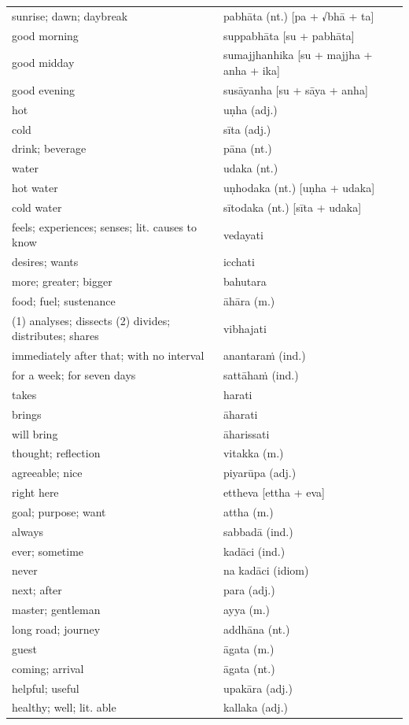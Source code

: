 \documentclass[11pt,oneside]{memoir}
\begin{document}
\begin{center}
\begin{tabular}{ll}
sunrise; dawn; daybreak & pabhāta (nt.) [pa + √bhā + ta]\\[0pt]
good morning & suppabhāta [su + pabhāta]\\[0pt]
good midday & sumajjhanhika [su + majjha + anha + ika]\\[0pt]
good evening & susāyanha [su + sāya + anha]\\[0pt]
hot & uṇha (adj.)\\[0pt]
cold & sīta (adj.)\\[0pt]
drink; beverage & pāna (nt.)\\[0pt]
water & udaka (nt.)\\[0pt]
hot water & uṇhodaka (nt.) [uṇha + udaka]\\[0pt]
cold water & sītodaka (nt.) [sīta + udaka]\\[0pt]
feels; experiences; senses; lit. causes to know & vedayati\\[0pt]
desires; wants & icchati\\[0pt]
more; greater; bigger & bahutara\\[0pt]
food; fuel; sustenance & āhāra (m.)\\[0pt]
(1) analyses; dissects (2) divides; distributes; shares & vibhajati\\[0pt]
immediately after that; with no interval & anantaraṁ (ind.)\\[0pt]
for a week; for seven days & sattāhaṁ (ind.)\\[0pt]
takes & harati\\[0pt]
brings & āharati\\[0pt]
will bring & āharissati\\[0pt]
thought; reflection & vitakka (m.)\\[0pt]
agreeable; nice & piyarūpa (adj.)\\[0pt]
right here & ettheva [ettha + eva]\\[0pt]
goal; purpose; want & attha (m.)\\[0pt]
always & sabbadā (ind.)\\[0pt]
ever; sometime & kadāci (ind.)\\[0pt]
never & na kadāci (idiom)\\[0pt]
next; after & para (adj.)\\[0pt]
master; gentleman & ayya (m.)\\[0pt]
long road; journey & addhāna (nt.)\\[0pt]
guest & āgata (m.)\\[0pt]
coming; arrival & āgata (nt.)\\[0pt]
helpful; useful & upakāra (adj.)\\[0pt]
healthy; well; lit. able & kallaka (adj.)\\[0pt]
\end{tabular}
\end{center}
\end{document}

